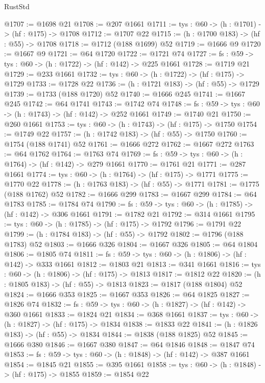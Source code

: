 \begin{lexlean}{RustStd}
\begin{coremodule}
@1707 := @1698 @21
@1708 := @207 @1661
@1711 := {tys : @60} -> (h : @1701) -> (hf : @175) -> @1708
@1712 := @1707 @22
@1715 := (h : @1700 @183) -> (hf : @55) -> @1708
@1718 := @1712 (@188 @1699) @52
@1719 := @1666 @9
@1720 := @1667 @9
@1721 := @64 @1720
@1722 := @1721 @74
@1727 := {fs : @59} -> {tys : @60} -> (h : @1722) -> (hf : @142) -> @225 @1661
@1728 := @1719 @21
@1729 := @233 @1661
@1732 := {tys : @60} -> (h : @1722) -> (hf : @175) -> @1729
@1733 := @1728 @22
@1736 := (h : @1721 @183) -> (hf : @55) -> @1729
@1739 := @1733 (@188 @1720) @52
@1740 := @1666 @245
@1741 := @1667 @245
@1742 := @64 @1741
@1743 := @1742 @74
@1748 := {fs : @59} -> {tys : @60} -> (h : @1743) -> (hf : @142) -> @252 @1661
@1749 := @1740 @21
@1750 := @260 @1661
@1753 := {tys : @60} -> (h : @1743) -> (hf : @175) -> @1750
@1754 := @1749 @22
@1757 := (h : @1742 @183) -> (hf : @55) -> @1750
@1760 := @1754 (@188 @1741) @52
@1761 := @1666 @272
@1762 := @1667 @272
@1763 := @64 @1762
@1764 := @1763 @74
@1769 := {fs : @59} -> {tys : @60} -> (h : @1764) -> (hf : @142) -> @279 @1661
@1770 := @1761 @21
@1771 := @287 @1661
@1774 := {tys : @60} -> (h : @1764) -> (hf : @175) -> @1771
@1775 := @1770 @22
@1778 := (h : @1763 @183) -> (hf : @55) -> @1771
@1781 := @1775 (@188 @1762) @52
@1782 := @1666 @299
@1783 := @1667 @299
@1784 := @64 @1783
@1785 := @1784 @74
@1790 := {fs : @59} -> {tys : @60} -> (h : @1785) -> (hf : @142) -> @306 @1661
@1791 := @1782 @21
@1792 := @314 @1661
@1795 := {tys : @60} -> (h : @1785) -> (hf : @175) -> @1792
@1796 := @1791 @22
@1799 := (h : @1784 @183) -> (hf : @55) -> @1792
@1802 := @1796 (@188 @1783) @52
@1803 := @1666 @326
@1804 := @1667 @326
@1805 := @64 @1804
@1806 := @1805 @74
@1811 := {fs : @59} -> {tys : @60} -> (h : @1806) -> (hf : @142) -> @333 @1661
@1812 := @1803 @21
@1813 := @341 @1661
@1816 := {tys : @60} -> (h : @1806) -> (hf : @175) -> @1813
@1817 := @1812 @22
@1820 := (h : @1805 @183) -> (hf : @55) -> @1813
@1823 := @1817 (@188 @1804) @52
@1824 := @1666 @353
@1825 := @1667 @353
@1826 := @64 @1825
@1827 := @1826 @74
@1832 := {fs : @59} -> {tys : @60} -> (h : @1827) -> (hf : @142) -> @360 @1661
@1833 := @1824 @21
@1834 := @368 @1661
@1837 := {tys : @60} -> (h : @1827) -> (hf : @175) -> @1834
@1838 := @1833 @22
@1841 := (h : @1826 @183) -> (hf : @55) -> @1834
@1844 := @1838 (@188 @1825) @52
@1845 := @1666 @380
@1846 := @1667 @380
@1847 := @64 @1846
@1848 := @1847 @74
@1853 := {fs : @59} -> {tys : @60} -> (h : @1848) -> (hf : @142) -> @387 @1661
@1854 := @1845 @21
@1855 := @395 @1661
@1858 := {tys : @60} -> (h : @1848) -> (hf : @175) -> @1855
@1859 := @1854 @22

\end{coremodule}
\end{lexlean}
